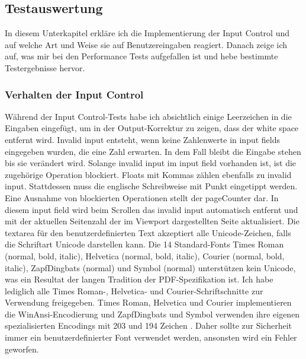\subsection{Testauswertung}
In diesem Unterkapitel erkläre ich die Implementierung der Input Control und auf welche Art und Weise sie auf Benutzereingaben reagiert. Danach zeige ich auf, was mir bei den Performance Tests aufgefallen ist und hebe bestimmte Testergebnisse hervor.

\subsubsection{Verhalten der Input Control}
Während der Input Control-Tests habe ich absichtlich einige Leerzeichen in die Eingaben eingefügt, um in der Output-Korrektur zu zeigen, dass der white space entfernt wird. Invalid input entsteht, wenn keine Zahlenwerte in input fields eingegeben wurden, die eine Zahl erwarten. In dem Fall bleibt die Eingabe stehen bis sie verändert wird. Solange invalid input im input field vorhanden ist, ist die zugehörige Operation blockiert. Floats mit Kommas zählen ebenfalls zu invalid input. Stattdessen muss die englische Schreibweise mit Punkt eingetippt werden. Eine Ausnahme von blockierten Operationen stellt der pageCounter dar. In diesem input field wird beim Scrollen das invalid input automatisch entfernt und mit der aktuellen Seitenzahl der im Viewport dargestellten Seite aktualisiert. Die textarea für den benutzerdefinierten Text akzeptiert alle Unicode-Zeichen, falls die Schriftart Unicode darstellen kann. Die 14 Standard-Fonts Times Roman (normal, bold, italic), Helvetica (normal, bold, italic), Courier (normal, bold, italic), ZapfDingbats (normal) und Symbol (normal) unterstützen kein Unicode, was ein Resultat der langen Tradition der PDF-Spezifikation ist. Ich habe lediglich alle Times Roman-, Helvetica- und Courier-Schriftschnitte zur Verwendung freigegeben. Times Roman, Helvetica und Courier implementieren die WinAnsi-Encodierung und ZapfDingbats und Symbol verwenden ihre eigenen spezialisierten Encodings mit 203 und 194 Zeichen \cite{pdf-lib}. Daher sollte zur Sicherheit immer ein benutzerdefinierter Font verwendet werden, ansonsten wird ein Fehler geworfen.
\par
